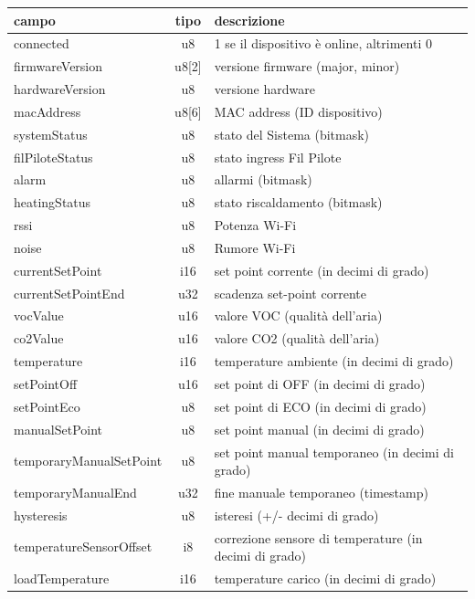 \documentclass[12pt,a4paper,twoside,titlepage]{book}
\begin{document}
\begin{center}
\begin{longtable}{| p{5cm} | c | p{8cm} |}
    \hline
    \textbf{campo} & \textbf{tipo} & \textbf{descrizione} \\ \hline
    connected & u8 & 1 se il dispositivo è online, altrimenti 0 \\ \hline
    firmwareVersion & u8[2] & versione firmware (major, minor) \\ \hline
    hardwareVersion & u8 & versione hardware \\ \hline
    macAddress & u8[6] & MAC address (ID dispositivo) \\ \hline
    systemStatus & u8 & stato del Sistema (bitmask) \\ \hline
    filPiloteStatus & u8 & stato ingress Fil Pilote \\ \hline
    alarm & u8 & allarmi (bitmask)\\ \hline
    heatingStatus & u8 & stato riscaldamento (bitmask)\\ \hline
    rssi & u8 &Potenza Wi-Fi\\ \hline
    noise & u8 &Rumore Wi-Fi\\ \hline
    currentSetPoint & i16 & set point corrente (in decimi di grado)\\ \hline
    currentSetPointEnd & u32 & scadenza set-point corrente\\ \hline
    vocValue & u16 & valore VOC (qualità dell’aria)\\ \hline
    co2Value & u16 & valore CO2 (qualità dell’aria)\\ \hline
    temperature & i16 & temperature ambiente (in decimi di grado)\\ \hline
    setPointOff & u16 & set point di OFF (in decimi di grado)\\ \hline
    setPointEco & u8 & set point di ECO (in decimi di grado)\\ \hline
    manualSetPoint & u8 & set point manual (in decimi di grado)\\ \hline
    temporaryManualSetPoint & u8 & set point manual temporaneo (in decimi di grado)\\ \hline
    temporaryManualEnd & u32 & fine manuale temporaneo (timestamp)\\ \hline
    hysteresis & u8 & isteresi (+/- decimi di grado)\\ \hline
    temperatureSensorOffset & i8 & correzione sensore di temperature (in decimi di grado)\\ \hline
    loadTemperature & i16 & temperature carico (in decimi di grado)\\ \hline

\end{longtable}
\end{center}
\end{document}
